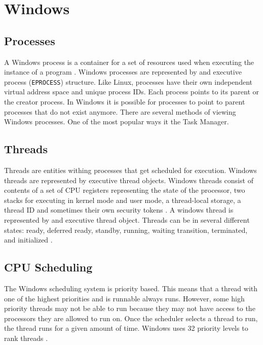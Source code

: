 \section{Windows}
\subsection{Processes}
\noindent
A Windows process is a container for a set of resources used when executing the instance of a program \cite{WindowsText}. 
Windows processes are represented by and executive process (\lstinline{EPROCESS}) structure.  Like Linux, processes have their own independent virtual address space and unique process IDs. Each process points to its parent or the creator process. In Windows it is possible for processes to point to parent processes that do not exist anymore. There are several methods of viewing Windows processes. One of the most popular ways it the Task Manager.    

\subsection{Threads}
\noindent
Threads are entities withing processes that get scheduled for execution. Windows threads are represented by executive thread objects. Windows threads consist of contents of a set of CPU registers representing the state of the processor, two stacks for executing in kernel mode and user mode, a thread-local storage, a thread ID and sometimes their own security tokens \cite{WindowsText}. A windows thread is represented by and executive thread object. Threads can be in several different states: ready, deferred ready, standby, running, waiting transition, terminated, and initialized \cite{WindowsText}.

\subsection{CPU Scheduling}
\noindent
The Windows scheduling system is priority based. This means that a thread with one of the highest priorities and is runnable always runs. However, some high priority threads may not be able to run because they may not have access to the processors they are allowed to run on. Once the scheduler selects a thread to run, the thread runs for a given amount of time. Windows uses 32 priority levels to rank threads \cite{WindowsText}.

